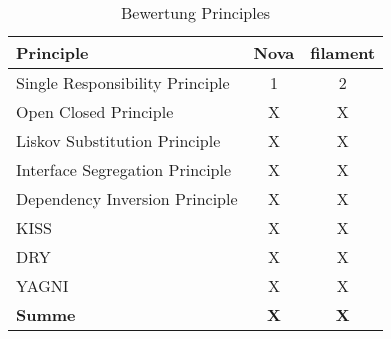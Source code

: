 \begin{table}[]
    \caption{Bewertung Principles}
    \label{tab:bewertung-principles}
    \centering
    \begin{tabular}{|l|c|c|}
        \hline
        \textbf{Principle}              & \textbf{Nova} & \textbf{filament} \\ \hline
        Single Responsibility Principle & 1             & 2                 \\ \hline
        Open Closed Principle           & X             & X                 \\ \hline
        Liskov Substitution Principle   & X             & X                 \\ \hline
        Interface Segregation Principle & X             & X                 \\ \hline
        Dependency Inversion Principle  & X             & X                 \\ \hline
        KISS                            & X             & X                 \\ \hline
        DRY                             & X             & X                 \\ \hline
        YAGNI                           & X             & X                 \\ \hline
        \textbf{Summe}                  & \textbf{X}    & \textbf{X}        \\ \hline
    \end{tabular}
\end{table}

\color{black}
